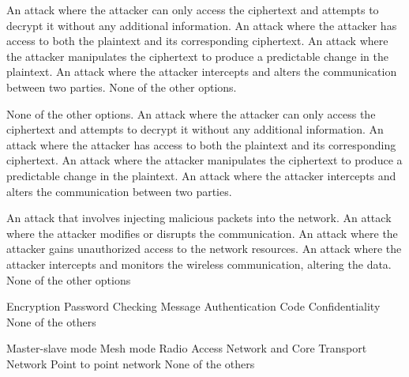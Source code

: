 \begin{checkboxes}
    \CorrectChoice An attack where the attacker can only access the ciphertext and attempts to decrypt it without any additional information.
    \choice An attack where the attacker has access to both the plaintext and its corresponding ciphertext.
    \choice An attack where the attacker manipulates the ciphertext to produce a predictable change in the plaintext.
    \choice An attack where the attacker intercepts and alters the communication between two parties.
    \choice None of the other options.
\end{checkboxes}

\begin{checkboxes}
    \CorrectChoice None of the other options.
    \choice An attack where the attacker can only access the ciphertext and attempts to decrypt it without any additional information.
    \choice An attack where the attacker has access to both the plaintext and its corresponding ciphertext.
    \choice An attack where the attacker manipulates the ciphertext to produce a predictable change in the plaintext.
    \choice An attack where the attacker intercepts and alters the communication between two parties.
\end{checkboxes}

\begin{checkboxes}
    \choice An attack that involves injecting malicious packets into the network.
    \choice An attack where the attacker modifies or disrupts the communication.
    \choice An attack where the attacker gains unauthorized access to the network resources.
    \choice An attack where the attacker intercepts and monitors the wireless communication, altering the data.
    \CorrectChoice None of the other options
\end{checkboxes}

\begin{checkboxes}
    \choice Encryption
    \choice Password Checking
    \choice Message Authentication Code
    \CorrectChoice Confidentiality
    \choice None of the others
\end{checkboxes}

\begin{checkboxes}
    \CorrectChoice Master-slave mode
    \CorrectChoice Mesh mode
    \choice Radio Access Network and Core Transport Network
    \choice Point to point network
    \choice None of the others
\end{checkboxes}


